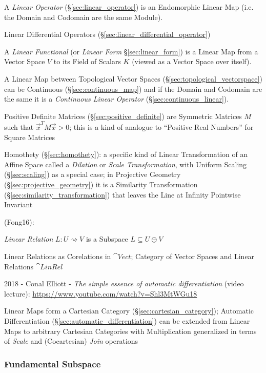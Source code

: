 A \emph{Linear Operator} (\S\ref{sec:linear_operator}) is an Endomorphic Linear
Map (i.e. the Domain and Codomain are the same Module).

\fist Linear Differential Operators (\S\ref{sec:linear_differential_operator})

A \emph{Linear Functional} (or \emph{Linear Form} \S\ref{sec:linear_form}) is a
Linear Map from a Vector Space $V$ to its Field of Scalars $K$ (viewed as a
Vector Space over itself).

A Linear Map between Topological Vector Spaces
(\S\ref{sec:topological_vectorspace}) can be Continuous
(\S\ref{sec:continuous_map}) and if the Domain and Codomain are the same it is a
\emph{Continuous Linear Operator} (\S\ref{sec:continuous_linear}).

Positive Definite Matrices (\S\ref{sec:positive_definite}) are Symmetric
Matrices $M$ such that $\vec{x}^T M \vec{x} > 0$; this is a kind of analogue to
``Positive Real Numbers'' for Square Matrices

Homothety (\S\ref{sec:homothety}): a specific kind of Linear Transformation of
an Affine Space called a \emph{Dilation} or \emph{Scale Transformation}, with
Uniform Scaling (\S\ref{sec:scaling}) as a special case; in Projective Geometry
(\S\ref{sec:projective_geometry}) it is a Similarity Transformation
(\S\ref{sec:similarity_transformation}) that leaves the Line at Infinity
Pointwise Invariant

(Fong16):


\emph{Linear Relation} $L : U \rightsquigarrow V$ is a Subspace $L
\subseteq U \oplus V$

Linear Relations as Corelations in $\cat{Vect}$; Category of Vector
Spaces and Linear Relations $\cat{LinRel}$

2018 - Conal Elliott - \emph{The simple essence of automatic differentiation}
(video lecture): \url{https://www.youtube.com/watch?v=Shl3MtWGu18}

Linear Maps form a Cartesian Category (\S\ref{sec:cartesian_category});
Automatic Differentiation (\S\ref{sec:automatic_differentiation}) can be
extended from Linear Maps to arbitrary Cartesian Categories with Multiplication
generalized in terms of \emph{Scale} and (Cocartesian) \emph{Join} operations



\subsubsection{Fundamental Subspace}\label{sec:fundamental_subspace}

